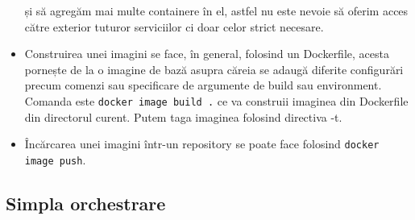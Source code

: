 \begin{itemize}
și să agregăm mai multe containere în el, astfel nu este nevoie să oferim acces către exterior tuturor 
serviciilor ci doar celor strict necesare.
    \item Construirea unei imagini se face, în general, folosind un Dockerfile, acesta pornește
de la o imagine de bază asupra căreia se adaugă diferite configurări precum comenzi sau specificare
de argumente de build sau environment. Comanda este \verb|docker image build .| ce va 
construii imaginea din Dockerfile din directorul curent. Putem taga imaginea folosind directiva 
-t.
    \item Încărcarea unei imagini într-un repository se poate face folosind \verb|docker image push|.
\end{itemize}

\subsection{Simpla orchestrare}

